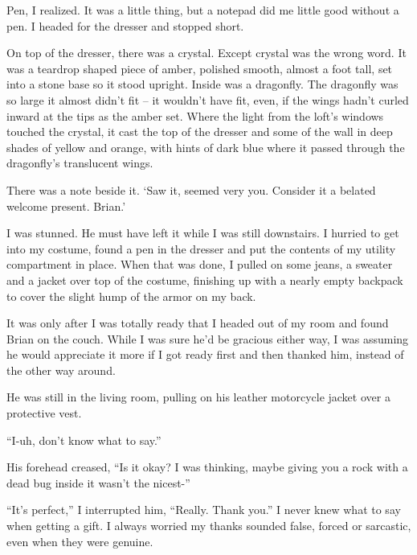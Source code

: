 Pen, I realized.  It was a little thing, but a notepad did me little good without a pen.  I headed for the dresser and stopped short.



On top of the dresser, there was a crystal.  Except crystal was the wrong word.  It was a teardrop shaped piece of amber, polished smooth, almost a foot tall, set into a stone base so it stood upright.  Inside was a dragonfly.  The dragonfly was so large it almost didn't fit – it wouldn't have fit, even, if the wings hadn't curled inward at the tips as the amber set.  Where the light from the loft's windows touched the crystal, it cast the top of the dresser and some of the wall in deep shades of yellow and orange, with hints of dark blue where it passed through the dragonfly's translucent wings.



There was a note beside it.  `Saw it, seemed very you.  Consider it a belated welcome present.  Brian.'



I was stunned.  He must have left it while I was still downstairs.  I hurried to get into my costume, found a pen in the dresser and put the contents of my utility compartment in place.  When that was done, I pulled on some jeans, a sweater and a jacket over top of the costume, finishing up with a nearly empty backpack to cover the slight hump of the armor on my back.



It was only after I was totally ready that I headed out of my room and found Brian on the couch.  While I was sure he'd be gracious either way, I was assuming he would appreciate it more if I got ready first and then thanked him, instead of the other way around.



He was still in the living room, pulling on his leather motorcycle jacket over a protective vest.



``I-uh, don't know what to say.''



His forehead creased, ``Is it okay?  I was thinking, maybe giving you a rock with a dead bug inside it wasn't the nicest-''



``It's perfect,'' I interrupted him, ``Really.  Thank you.''  I never knew what to say when getting a gift.  I always worried my thanks sounded false, forced or sarcastic, even when they were genuine.




